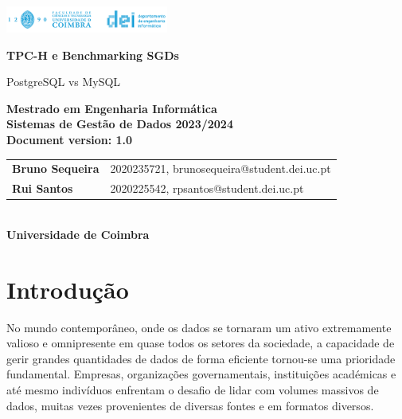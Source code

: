 \documentclass{article}
\begin{document}
\begin{titlepage}
    \centering
    \vspace*{1cm}

    \includegraphics[width=0.4\textwidth]{dei_thumb.png} %

    \vspace{1.5cm}
    {\LARGE \textbf{TPC-H e Benchmarking SGDs} \par}
   
    {\Large PostgreSQL vs MySQL \par}

    \vspace{2.5cm}
    \textbf{Mestrado em Engenharia Informática} \\
    \textbf{Sistemas de Gestão de Dados 2023/2024} \\
    \vspace{0.5cm} 
    \textbf{Document version: 1.0} \\
    \vspace{3cm}
    \begin{tabular}{ll}
        \textbf{Bruno Sequeira} & 2020235721, brunosequeira@student.dei.uc.pt \\
        \textbf{Rui Santos} & 2020225542, rpsantos@student.dei.uc.pt
        
      
    \end{tabular}\\
    \vspace{1.5cm} 
    \textbf{Universidade de Coimbra}

    \date{}

    \vfill

\end{titlepage}
   \clearpage
   \tableofcontents
   \clearpage
   \listoffigures
   \listoftables

\clearpage
\section{Introdução}
\quad No mundo contemporâneo, onde os dados se tornaram um ativo extremamente valioso e omnipresente em quase todos os setores da sociedade, a capacidade de gerir grandes quantidades de dados de forma eficiente tornou-se uma prioridade fundamental. Empresas, organizações governamentais, instituições académicas e até mesmo indivíduos enfrentam o desafio de lidar com volumes massivos de dados, muitas vezes provenientes de diversas fontes e em formatos diversos.\\
\end{document}

